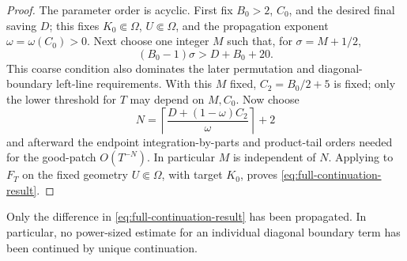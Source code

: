 \begin{proof}
The parameter order is acyclic.  First fix $B_0>2$, $C_0$, and the desired
final saving $D$; this fixes $K_0\Subset\Omega$, $U\Subset\Omega$, and the
propagation exponent $\omega=\omega(C_0)>0$.  Next choose one integer $M$
such that, for $\sigma=M+1/2$,
\begin{equation}\label{eq:M-before-N}
                         (B_0-1)\sigma>D+B_0+20.
\end{equation}
This coarse condition also dominates the later permutation and
diagonal-boundary left-line requirements.  With this $M$ fixed,
$C_2=B_0/2+5$ is fixed; only the lower threshold for $T$ may depend on
$M,C_0$.  Now choose
\begin{equation}\label{eq:N-after-M}
 N=\left\lceil\frac{D+(1-\omega)C_2}{\omega}\right\rceil+2
\end{equation}
and afterward the endpoint integration-by-parts and product-tail orders
needed for the good-patch $O(T^{-N})$.  In particular $M$ is independent of
$N$.  Applying  to $F_T$ on the fixed geometry
$U\Subset\Omega$, with target $K_0$, proves
\eqref{eq:full-continuation-result}.
\end{proof}

Only the difference in \eqref{eq:full-continuation-result} has been
propagated.  In particular, no power-sized estimate for an individual
diagonal boundary term has been continued by unique continuation.
